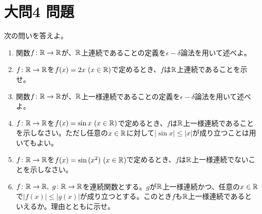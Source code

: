 \documentclass[dvipdfmx]{jsreport}
\begin{document}
\section{大問4 問題}
\begin{tcolorbox} %
	次の問いを答えよ。
\begin{enumerate}
	\item 関数$f\colon \mathbb{R}\to \mathbb{R}$が、$\mathbb{R}$上連続であることの定義を$\epsilon- \delta$論法を用いて述べよ。
	\item $f\colon \mathbb{R}\to \mathbb{R}$を$f(x)= 2x\ (x\in \mathbb{R})$で定めるとき、$f$は$\mathbb{R}$上連続であることを示せ。
	\item 関数$f\colon \mathbb{R}\to \mathbb{R}$が、$\mathbb{R}$上一様連続であることの定義を$\epsilon- \delta$論法を用いて述べよ。
	\item $f\colon \mathbb{R}\to \mathbb{R}$を$f(x)= \sin{x}\ (x\in \mathbb{R})$で定めるとき、$f$は$\mathbb{R}$上一様連続であることを示しなさい。ただし任意の$x\in \mathbb{R}$に対して$|\sin{x}|\le |x|$が成り立つことは用いてもよい。
	\item $f\colon \mathbb{R}\to \mathbb{R}$を$f(x)= \sin{(x^2)}\ (x\in \mathbb{R})$で定めるとき、$f$は$\mathbb{R}$上一様連続でないことを示しなさい。
	\item $f\colon \mathbb{R}\to \mathbb{R},\ g\colon \mathbb{R}\to \mathbb{R}$を連続関数とする。$g$が$\mathbb{R}$上一様連続かつ、任意の$x\in \mathbb{R}$で$|f(x)|\le |g(x)|$が成り立つとする。このとき$f$も$\mathbb{R}$上一様連続であるといえるか。理由とともに示せ。
\end{enumerate}
\end{tcolorbox}
\end{document}
